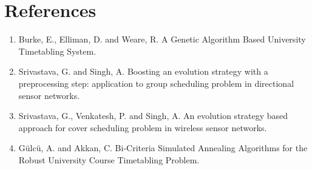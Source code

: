 \chapter*{References}

\begin{enumerate}
    \item[{[1]}] Burke, E., Elliman, D. and Weare, R. A Genetic Algorithm Based University Timetabling System.
    \item[{[2]}] Srivastava, G. and Singh, A. Boosting an evolution strategy with a preprocessing step: application to group scheduling problem in directional sensor networks.
    \item[{[3]}] Srivastava, G., Venkatesh, P. and Singh, A. An evolution strategy based approach for cover scheduling problem in wireless sensor networks.
    \item[{[4]}] Gülcü, A. and Akkan, C. Bi-Criteria Simulated Annealing Algorithms for the Robust University Course Timetabling Problem.
\end{enumerate}